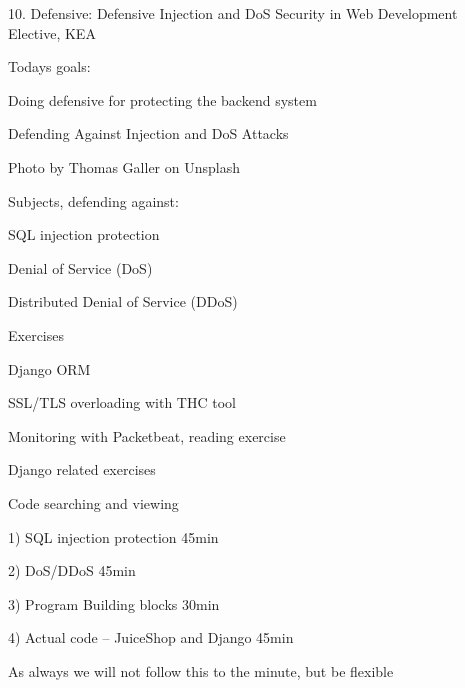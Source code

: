 \documentclass[Screen16to9,17pt]{foils}
\begin{document}
\mytitlepage
{10. Defensive: Defensive Injection and DoS}
{Security in Web Development Elective, KEA}




Todays goals:
\begin{list2}
\item Doing defensive for protecting the backend system
\item Defending Against Injection and DoS Attacks
\end{list2}

Photo by Thomas Galler on Unsplash




\begin{list1}
\item Subjects, defending against:
\begin{list2}
\item SQL injection protection
\item Denial of Service (DoS)
\item Distributed Denial of Service (DDoS)
\end{list2}
\item Exercises
\begin{list2}
\item Django ORM
\item SSL/TLS overloading with THC tool
\item Monitoring with Packetbeat, reading exercise
\item Django related exercises
\item Code searching and viewing
\end{list2}
\end{list1}


\begin{list2}
\item 1) SQL injection protection 45min
\item 2) DoS/DDoS 45min
\item 3) Program Building blocks 30min
\item 4) Actual code -- JuiceShop and Django 45min
\end{list2}

As always we will not follow this to the minute, but be flexible

\end{document}
